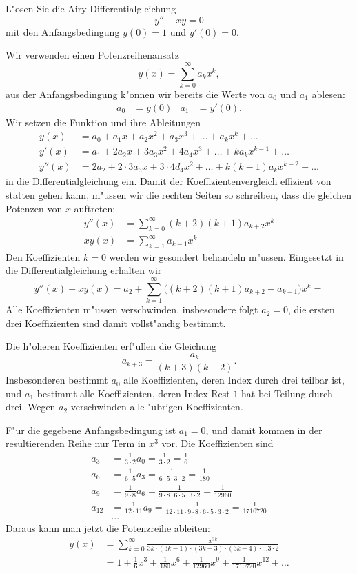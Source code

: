 L"osen Sie die Airy-Differentialgleichung
\[
y''-xy=0
\]
mit den Anfangsbedingung $y(0)=1$ und $y'(0)=0$.

\begin{loesung}
Wir verwenden einen Potenzreihenansatz
\[
y(x)=\sum_{k=0}^\infty a_kx^k,
\]
aus der Anfangsbedingung k"onnen wir bereits die Werte von $a_0$ und
$a_1$ ablesen:
\begin{align*}
a_0&=y(0)&
a_1&=y'(0).
\end{align*}
Wir setzen die Funktion und ihre Ableitungen
\begin{align*}
y(x)&=a_0+a_1x+a_2x^2+a_3x^3+\dots+a_kx^k+\dots
\\
y'(x)&=a_1+2a_2x+3a_3x^2+4a_4x^3+\dots+ka_kx^{k-1}+\dots
\\
y''(x)&=2a_2+2\cdot 3a_3x + 3\cdot 4d_4x^2+\dots +k(k-1)a_kx^{k-2}+\dots
\end{align*}
in die Differentialgleichung ein.
Damit der Koeffizientenvergleich effizient von statten gehen kann,
m"ussen wir die rechten Seiten so schreiben, dass die gleichen Potenzen
von $x$ auftreten:
\begin{align*}
y''(x)
&=
\sum_{k=0}^\infty (k+2)(k+1)a_{k+2}x^k
\\
xy(x)
&=
\sum_{k=1}^\infty a_{k-1}x^k
\end{align*}
Den Koeffizienten $k=0$ werden wir gesondert behandeln m"ussen.
Eingesetzt in die Differentialgleichung erhalten wir
\[
y''(x)-xy(x)
=
a_2 + \sum_{k=1}^\infty \bigl((k+2)(k+1)a_{k+2}-a_{k-1}\bigr)x^k=
\]
Alle Koeffizienten m"ussen verschwinden, insbesondere folgt $a_2=0$,
die ersten drei Koeffizienten sind damit vollst"andig bestimmt.

Die h"oheren Koeffizienten erf"ullen die Gleichung
\[
a_{k+3}=\frac{a_k}{(k+3)(k+2)}.
\]
Insbesonderen bestimmt $a_0$ alle Koeffizienten, deren Index durch
drei teilbar ist, und $a_1$ bestimmt alle Koeffizienten, deren Index
Rest $1$ hat bei Teilung durch drei.
Wegen $a_2$ verschwinden alle "ubrigen Koeffizienten.

F"ur die gegebene Anfangsbedingung ist $a_1=0$, und damit kommen in der
resultierenden Reihe nur Term in $x^3$ vor.
Die Koeffizienten sind
\begin{align*}
a_3&=\frac1{3\cdot 2}a_0=\frac1{3\cdot 2}=\frac16\\
a_6&=\frac1{6\cdot 5}a_3=\frac1{6\cdot 5\cdot 3\cdot 2}=\frac1{180}\\
a_9&=\frac1{9\cdot 8}a_6=\frac1{9\cdot 8\cdot 6\cdot 5\cdot 3\cdot 2}=\frac1{12960}\\
a_{12}&=\frac1{12\cdot 11}a_9=\frac1{12\cdot 11\cdot 9\cdot 8\cdot 6\cdot 5\cdot 3\cdot 2}=\frac1{1710720}
\\
&\dots
\end{align*}
Daraus kann man jetzt die Potenzreihe ableiten:
\begin{align*}
y(x)
&=
\sum_{k=0}^\infty \frac{x^{3k}}{3k\cdot(3k-1)\cdot (3k-3)\cdot(3k-4)\cdot \dots 3\cdot 2}
\\
&=
1 + \frac16x^3+\frac1{180}x^6+\frac1{12960}x^9+\frac1{1710720}x^{12}+\dots
\end{align*}
\end{loesung}

